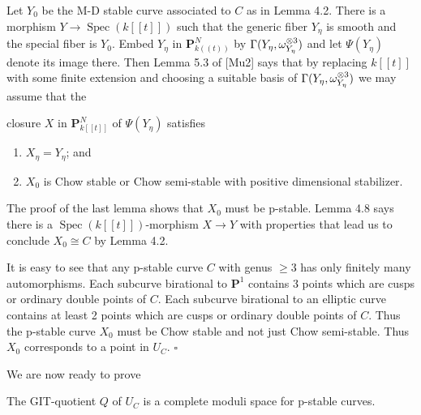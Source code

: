 \documentclass[12pt]{memoir}
\providecommand{\Spec}{\operatorname{Spec}}
\begin{document}
\begin{ptcbp}
Let $Y_0$ be the M-D stable curve associated to $C$ as in Lemma 4.2. There is a morphism $Y \to \Spec(k[[t]])$ such that the generic fiber $Y_\eta$ is smooth and the special fiber is $Y_0$. Embed $Y_\eta$ in $\mathbf{P}^N_{k((t))}$ by $\Gamma(Y_\eta, \omega_{Y_\eta}^{\otimes 3})$ and let $\Psi(Y_\eta)$ denote its image there. Then Lemma 5.3 of [Mu2] says that by replacing $k[[t]]$ with some finite extension and choosing a suitable basis of $\Gamma(Y_\eta, \omega_{Y_\eta}^{\otimes 3})$ we may assume that the


closure $X$ in $\mathbf{P}^N_{k[[t]]}$ of $\Psi(Y_\eta)$ satisfies

\begin{enumerate}[\upshape(i)]
\item $X_\eta = Y_\eta$; and
\item $X_0$ is Chow stable or Chow semi-stable with positive dimensional stabilizer.
\end{enumerate}

The proof of the last lemma shows that $X_0$ must be p-stable. Lemma 4.8 says there is a $\Spec(k[[t]])$-morphism $X \to Y$ with properties that lead us to conclude $X_0 \cong C$ by Lemma 4.2.

It is easy to see that any p-stable curve $C$ with genus $\geqslant 3$ has only finitely many automorphisms. Each subcurve birational to $\mathbf{P}^1$ contains 3 points which are cusps or ordinary double points of $C$. Each subcurve birational to an elliptic curve contains at least 2 points which are cusps or ordinary double points of $C$. Thus the p-stable curve $X_0$ must be Chow stable and not just Chow semi-stable. Thus $X_0$ corresponds to a point in $U_C$. \hfill$\square$
\end{ptcbp}

We are now ready to prove

\begin{Th}\label{thm:5.4}
The GIT-quotient $Q$ of $U_C$ is a complete moduli space for p-stable curves.
\end{Th}
\end{document}
